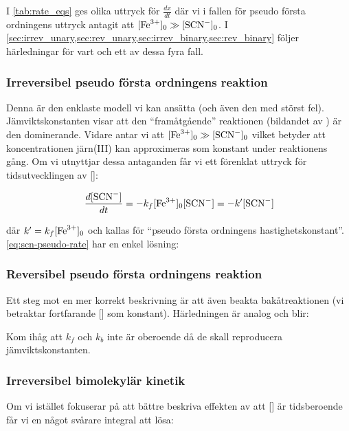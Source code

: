 

I \cref{tab:rate_eqs} ges olika uttryck för $\frac{dx}{dt}$ där vi i
fallen för pseudo första ordningens uttryck antagit att $[\ce{Fe^3+}]_0
\gg [\ce{SCN-}]_0$. I
\cref{sec:irrev_unary,sec:rev_unary,sec:irrev_binary,sec:rev_binary}
följer härledningar för vart och ett av dessa fyra fall.


\subsubsection{Irreversibel pseudo första ordningens reaktion}
\label{sec:irrev_unary}
Denna är den enklaste modell vi kan ansätta (och även den med störst fel).
Jämviktskonstanten visar att den ``framåtgående'' reaktionen (bildandet av )
är den dominerande. Vidare antar vi att $[\ce{Fe^3+}]_0 \gg [\ce{SCN-}]_0$ vilket
betyder att koncentrationen järn(III) kan approximeras som konstant under
reaktionens gång. Om vi utnyttjar dessa antaganden får vi ett förenklat
uttryck för tidsutvecklingen av []:

\begin{equation}
  \label{eq:scn-pseudo-rate}
  \frac{d[\ce{SCN-}]}{dt} = -k_f[\ce{Fe^3+}]_0[\ce{SCN-}] = -k'[\ce{SCN-}]
\end{equation}

där $k' = k_f[\ce{Fe^3+}]_0$ och kallas för ``pseudo första ordningens
hastighetskonstant''. \cref{eq:scn-pseudo-rate} har en enkel lösning: 



\subsubsection{Reversibel pseudo första ordningens reaktion}
\label{sec:rev_unary}
Ett steg mot en mer korrekt beskrivning är att även beakta
bakåtreaktionen (vi betraktar fortfarande [] som
konstant). Härledningen är analog och blir:


Kom ihåg att $k_f$ och $k_b$ inte är oberoende då de skall reproducera
jämviktskonstanten.

\subsubsection{Irreversibel bimolekylär kinetik}
\label{sec:irrev_binary}
Om vi istället fokuserar på att bättre beskriva effekten av att
[] är tidsberoende får vi en något svårare integral att lösa:

